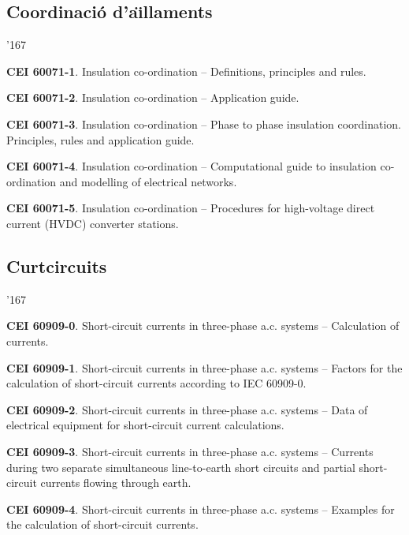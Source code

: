 \subsection*{Coordinaci\'{o} d'a\"{\i}llaments}
\begin{dinglist}{'167}
    \item \textbf{CEI 60071-1}. Insulation co-ordination -- Definitions, principles and rules.
    \item \textbf{CEI 60071-2}. Insulation co-ordination -- Application guide.
    \item \textbf{CEI 60071-3}. Insulation co-ordination -- Phase to phase insulation coordination. Principles, rules and application guide.
    \item \textbf{CEI 60071-4}. Insulation co-ordination -- Computational guide to insulation co-ordination and modelling of electrical networks.
    \item \textbf{CEI 60071-5}. Insulation co-ordination -- Procedures for high-voltage direct current (HVDC) converter stations.
\end{dinglist}

\subsection*{Curtcircuits}
\begin{dinglist}{'167}
    \item \textbf{CEI 60909-0}. Short-circuit currents in three-phase a.c. systems -- Calculation of currents.
    \item \textbf{CEI 60909-1}. Short-circuit currents in three-phase a.c. systems --  Factors for the calculation of short-circuit currents according to IEC 60909-0.
    \item \textbf{CEI 60909-2}. Short-circuit currents in three-phase a.c. systems --  Data of electrical equipment for short-circuit current calculations.
    \item \textbf{CEI 60909-3}. Short-circuit currents in three-phase a.c. systems -- Currents during two separate simultaneous line-to-earth short circuits and partial short-circuit currents flowing through earth.
    \item \textbf{CEI 60909-4}. Short-circuit currents in three-phase a.c. systems -- Examples for the calculation of short-circuit currents.
\end{dinglist}

